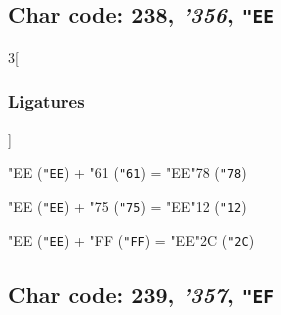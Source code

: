 \documentclass{article}
\newlength{\maxcharwidth}
\begin{document}
\subsection{Char code: 238, {\it'356}, {\tt"EE}}
\label{char_238}


\begin{multicols}{3}[\subsubsection{Ligatures}]

{\testfont\char"EE\noboundary} ({\tt"EE}) + {\testfont\char"61\noboundary} ({\tt"61}) = {\testfont\char"EE\noboundary}{\testfont\char"78\noboundary} ({\tt"78}) 

{\testfont\char"EE\noboundary} ({\tt"EE}) + {\testfont\char"75\noboundary} ({\tt"75}) = {\testfont\char"EE\noboundary}{\testfont\char"12\noboundary} ({\tt"12}) 

{\testfont\char"EE\noboundary} ({\tt"EE}) + {\testfont\char"FF\noboundary} ({\tt"FF}) = {\testfont\char"EE\noboundary}{\testfont\char"2C\noboundary} ({\tt"2C}) 

\end{multicols}

\subsection{Char code: 239, {\it'357}, {\tt"EF}}
\label{char_239}

\end{document}
